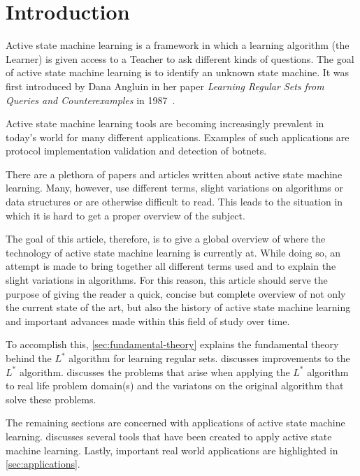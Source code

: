 \section*{Introduction}
\label{sec:introduction}

Active state machine learning is a framework in which a learning algorithm (the
Learner) is given access to a Teacher to ask different kinds of questions. The
goal of active state machine learning is to identify an unknown state machine.
It was first introduced by Dana Angluin in her paper \textit{Learning Regular
  Sets from Queries and Counterexamples} in 1987~\cite{Angluin1987}.

Active state machine learning tools are becoming increasingly prevalent in
today's world for many different applications. Examples of such applications are
protocol implementation validation and detection of botnets.

There are a plethora of papers and articles written about active state machine
learning. Many, however, use different terms, slight variations on algorithms
or data structures or are otherwise difficult to read. This leads to the
situation in which it is hard to get a proper overview of the subject.

The goal of this article, therefore, is to give a global overview of where the
technology of active state machine learning is currently at. While doing so, an
attempt is made to bring together all different terms used and to explain the
slight variations in algorithms. For this reason, this article should serve the
purpose of giving the reader a quick, concise but complete overview of not only
the current state of the art, but also the history of active state machine
learning and important advances made within this field of study over time.

To accomplish this, \cref{sec:fundamental-theory} explains the fundamental
theory behind the $L^{*}$ algorithm for learning regular
sets.  discusses improvements to the $L^{*}$
algorithm.  discusses the problems that arise when applying
the $L^{*}$ algorithm to real life problem domain(s) and the variatons on the
original algorithm that solve these problems.

The remaining sections are concerned with applications of active state machine
learning.  discusses several tools that have been created to
apply active state machine learning. Lastly, important real world applications
are highlighted in \cref{sec:applications}.

\newpage
